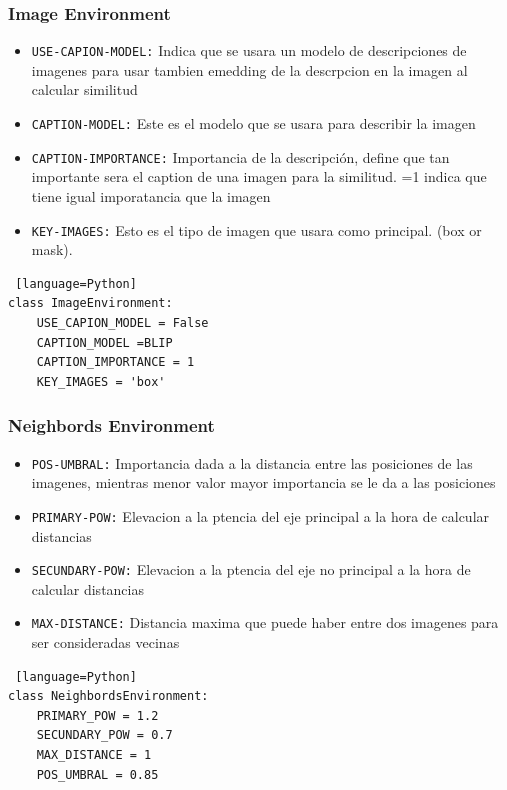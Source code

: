 \subsubsection*{Image Environment}
\begin{itemize}
\item \verb|USE-CAPION-MODEL:| Indica que se usara un modelo de descripciones de imagenes para usar tambien emedding de la descrpcion en la imagen al calcular similitud
\item \verb|CAPTION-MODEL:| Este es el modelo que se usara para describir la imagen
\item \verb|CAPTION-IMPORTANCE:| Importancia de la descripci\'on, define que tan importante sera el caption de una imagen para la similitud. =1 indica que tiene igual imporatancia que la imagen
\item \verb|KEY-IMAGES:| Esto es el tipo de imagen que usara como principal. (box or mask).
\end{itemize}

\begin{lstlisting} [language=Python]
class ImageEnvironment:
    USE_CAPION_MODEL = False
    CAPTION_MODEL =BLIP
    CAPTION_IMPORTANCE = 1
    KEY_IMAGES = 'box'
\end{lstlisting} 


\subsubsection*{Neighbords Environment}
\begin{itemize}
\item \verb|POS-UMBRAL:| Importancia dada a la distancia entre las posiciones de las imagenes, mientras menor valor mayor importancia se le da a las posiciones
\item \verb|PRIMARY-POW:| Elevacion a la ptencia del eje principal a la hora de calcular distancias
\item \verb|SECUNDARY-POW:| Elevacion a la ptencia del eje no principal a la hora de calcular distancias
\item \verb|MAX-DISTANCE:| Distancia maxima que puede haber entre dos imagenes para ser consideradas vecinas
\end{itemize}

\begin{lstlisting} [language=Python]
class NeighbordsEnvironment:
    PRIMARY_POW = 1.2
    SECUNDARY_POW = 0.7
    MAX_DISTANCE = 1
    POS_UMBRAL = 0.85
\end{lstlisting} 

